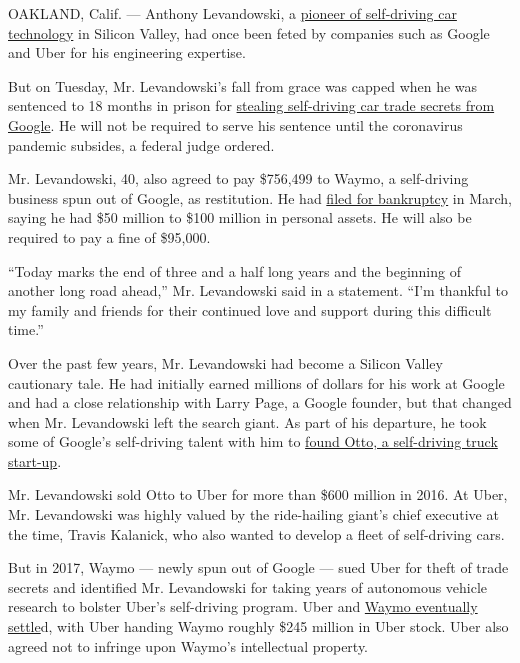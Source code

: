 OAKLAND, Calif. --- Anthony Levandowski, a
\href{https://www.nytimes3xbfgragh.onion/2016/05/17/technology/want-to-buy-a-self-driving-car-trucks-may-come-first.html}{pioneer
of self-driving car technology} in Silicon Valley, had once been feted
by companies such as Google and Uber for his engineering expertise.

But on Tuesday, Mr. Levandowski's fall from grace was capped when he was
sentenced to 18 months in prison for
\href{https://www.nytimes3xbfgragh.onion/2020/03/19/technology/levandowski-uber-google-plea.html}{stealing
self-driving car trade secrets from Google}. He will not be required to
serve his sentence until the coronavirus pandemic subsides, a federal
judge ordered.

Mr. Levandowski, 40, also agreed to pay \$756,499 to Waymo, a
self-driving business spun out of Google, as restitution. He had
\href{https://www.nytimes3xbfgragh.onion/2020/03/04/technology/anthony-levandowski-google-uber.html}{filed
for bankruptcy} in March, saying he had \$50 million to \$100 million in
personal assets. He will also be required to pay a fine of \$95,000.

``Today marks the end of three and a half long years and the beginning
of another long road ahead,'' Mr. Levandowski said in a statement. ``I'm
thankful to my family and friends for their continued love and support
during this difficult time.''

Over the past few years, Mr. Levandowski had become a Silicon Valley
cautionary tale. He had initially earned millions of dollars for his
work at Google and had a close relationship with Larry Page, a Google
founder, but that changed when Mr. Levandowski left the search giant. As
part of his departure, he took some of Google's self-driving talent with
him to
\href{https://www.nytimes3xbfgragh.onion/2016/05/17/technology/want-to-buy-a-self-driving-car-trucks-may-come-first.html}{found
Otto, a self-driving truck start-up}.

Mr. Levandowski sold Otto to Uber for more than \$600 million in 2016.
At Uber, Mr. Levandowski was highly valued by the ride-hailing giant's
chief executive at the time, Travis Kalanick, who also wanted to develop
a fleet of self-driving cars.

But in 2017, Waymo --- newly spun out of Google --- sued Uber for theft
of trade secrets and identified Mr. Levandowski for taking years of
autonomous vehicle research to bolster Uber's self-driving program. Uber
and
\href{https://www.nytimes3xbfgragh.onion/2018/02/09/technology/uber-waymo-lawsuit-driverless.html}{Waymo
eventually settle}d, with Uber handing Waymo roughly \$245 million in
Uber stock. Uber also agreed not to infringe upon Waymo's intellectual
property.


